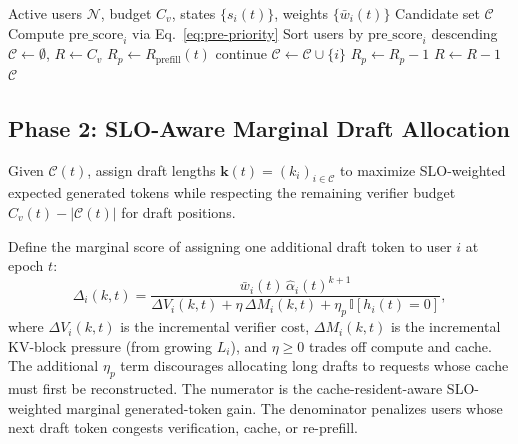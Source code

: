 \documentclass[journal]{IEEEtran}
\newcommand{\ind}{\mathbb{I}}
\begin{document}
\begin{algorithm}[t]
\caption{Candidate Batch Selection}
\label{alg:candidate}
\begin{algorithmic}[1]
\REQUIRE Active users $\mathcal{N}$, budget $C_v$, 
         states $\{s_i(t)\}$, weights $\{\bar{w}_i(t)\}$
\ENSURE Candidate set $\mathcal{C}$
\STATE Compute $\text{pre\_score}_i$ via Eq.~\eqref{eq:pre-priority}
\STATE Sort users by $\text{pre\_score}_i$ descending
\STATE $\mathcal{C} \leftarrow \emptyset$, $R \leftarrow C_v$
\STATE $R_p \leftarrow R_{\text{prefill}}(t)$
            \STATE continue
        \ENDIF
        \STATE $\mathcal{C} \leftarrow \mathcal{C} \cup \{i\}$
            \STATE $R_p \leftarrow R_p - 1$
        \ENDIF
        \STATE $R \leftarrow R - 1$ 
    \ENDIF
\ENDFOR
\RETURN $\mathcal{C}$
\end{algorithmic}
\end{algorithm}

\subsection{Phase 2: SLO-Aware Marginal Draft Allocation}
\label{sec:alg-draft}

Given $\mathcal{C}(t)$, assign draft lengths 
$\mathbf{k}(t) = (k_i)_{i \in \mathcal{C}}$ to maximize 
SLO-weighted expected generated tokens while respecting 
the remaining verifier budget $C_v(t) - |\mathcal{C}(t)|$ 
for draft positions.

Define the marginal score of assigning one additional 
draft token to user $i$ at epoch $t$:
\begin{equation}
    \label{eq:marginal-score}
    \Delta_i(k, t) = 
    \frac{\bar{w}_i(t)\,\hat{\alpha}_{i}(t)^{k+1}}
    {\Delta V_i(k, t) + \eta \, \Delta M_i(k, t)
    + \eta_p\,\ind[h_i(t)=0]},
\end{equation}
where $\Delta V_i(k,t)$ is the incremental verifier cost, 
$\Delta M_i(k,t)$ is the incremental KV-block pressure 
(from growing $L_i$), and $\eta \geq 0$ trades off compute 
and cache. The additional $\eta_p$ term discourages allocating 
long drafts to requests whose cache must first be reconstructed. 
The numerator is the cache-resident-aware SLO-weighted marginal 
generated-token gain. The denominator penalizes users whose 
next draft token congests verification, cache, or re-prefill.
\end{document}
